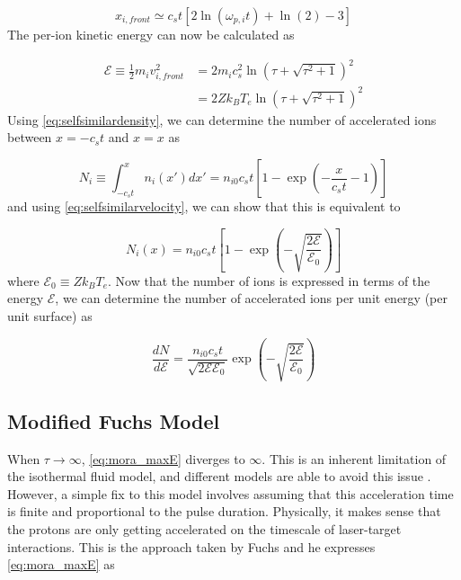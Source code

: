 \begin{equation}
	x_{i, front} \simeq c_s t [2 \ln(\omega_{p,i} t) + \ln(2) - 3] \label{eq:mora_xfront_simple}
\end{equation}
The per-ion kinetic energy can now be calculated as

\begin{align}
	\mathcal{E} \equiv \frac{1}{2} m_i v_{i,front}^2 &= 2 m_i c_s^2 \ln(\tau + \sqrt{\tau^2 + 1})^2  \nonumber\\
	&= 2 Z k_B T_{e} \ln(\tau + \sqrt{\tau^2 + 1})^2 \label{eq:mora_maxE}
\end{align}
Using \cref{eq:selfsimilardensity}, we can determine the number of accelerated ions between $x = -c_s t$ and $x = x$ as

\begin{equation}
	N_i \equiv \int_{-c_s t}^{x} n_i(x') dx' = n_{i0} c_s t [1 - \exp(-\frac{x}{c_s t} - 1)]
\end{equation}
and using \cref{eq:selfsimilarvelocity}, we can show that this is equivalent to 

\begin{equation}
	N_i(x) = n_{i0} c_s t [1 - \exp(-\sqrt{\frac{2 \mathcal{E}}{\mathcal{E}_0}})] \label{eq:numprotons}
\end{equation}
where $\mathcal{E}_0 \equiv Z k_B T_e$. Now that the number of ions is expressed in terms of the energy $\mathcal{E}$, we can determine the number of accelerated ions per unit energy (per unit surface) as 

\begin{equation}
	\frac{d N}{d \mathcal{E}} = \frac{n_{i0} c_s t}{\sqrt{2 \mathcal{E} \mathcal{E}_0}} \exp(-\sqrt{\frac{2 \mathcal{E}}{\mathcal{E}_0}}) \label{eq:dNdE}
\end{equation}
	
\subsection{Modified Fuchs Model} \label{sec:fuchsv1}

When $\tau \rightarrow \infty$, \cref{eq:mora_maxE} diverges to $\infty$. This is an inherent limitation of the isothermal fluid model, and different models are able to avoid this issue \cite{Mora_2005_PRE,Passoni_2010_NJoP,Schreiber_2006_PRL}. However, a simple fix to this model involves assuming that this acceleration time is finite and proportional to the pulse duration. Physically, it makes sense that the protons are only getting accelerated on the timescale of  laser-target interactions. This is the approach taken by Fuchs \cite{Fuchs_2005_Nat} and he expresses \cref{eq:mora_maxE} as 

